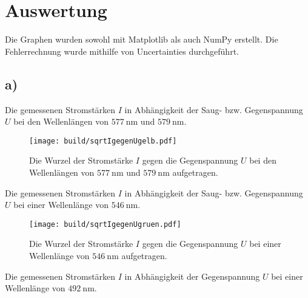 \section{Auswertung}
\label{sec:Auswertung}

Die Graphen wurden sowohl mit Matplotlib \cite{matplotlib} als auch NumPy \cite{numpy} erstellt. Die
 Fehlerrechnung wurde mithilfe von Uncertainties \cite{uncertainties} durchgeführt. 

\subsection{a)}
\begin{center}
	\begin{table}
		\caption{Die gemessenen Stromstärken $I$ in Abhängigkeit der Saug- bzw. Gegenspannung $U$ bei den Wellenlängen von $\SI{577}{\nano\meter}$ und $ \SI{579}{\nano\meter}$.}
		\begin{minipage}[t]{0.5\textwidth}
			\centering
			
		\end{minipage}
		\begin{minipage}[t]{0.5\textwidth}
			\centering
			
		\end{minipage}
	\end{table}
\end{center}
\begin{figure}
	\centering
	\caption{Die Wurzel der Stromstärke $I$ gegen die Gegenspannung $U$ bei den Wellenlängen von $\SI{577}{\nano\meter}$ und $ \SI{579}{\nano\meter}$ aufgetragen.}
	\texttt{[image: build/sqrtIgegenUgelb.pdf]}
	\label{fig:Graphgelb1}
\end{figure}
\begin{table}
	\centering
	\caption{Die gemessenen Stromstärken $I$ in Abhängigkeit der Saug- bzw. Gegenspannung $U$ bei einer Wellenlänge von $\SI{546}{\nano\meter}$.}
	
\end{table}
\begin{figure}
	\centering
	\caption{Die Wurzel der Stromstärke $I$ gegen die Gegenspannung $U$ bei einer Wellenlänge von $\SI{546}{\nano\meter}$ aufgetragen.}
	\texttt{[image: build/sqrtIgegenUgruen.pdf]}
	\label{fig:Graphgruen}
\end{figure}
\begin{table}
	\centering
	\caption{Die gemessenen Stromstärken $I$ in Abhängigkeit der Gegenspannung $U$ bei einer Wellenlänge von $\SI{492}{\nano\meter}$.}
	
\end{table}

